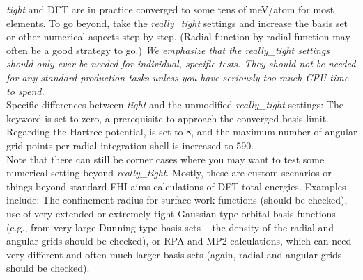 \begin{itemize}
    \emph{tight} and DFT are in practice converged to some tens of
    meV/atom for most elements. To go beyond, take the
    \emph{really\_tight} settings and increase the basis set or other
    numerical aspects step by step. (Radial function by radial 
    function may often be a good strategy to go.) \emph{We emphasize
    that the \emph{really\_tight} settings should only ever be
    needed for individual, specific tests. They should not be
    needed for any standard production tasks unless you have
    seriously too much CPU time to spend.} \\ Specific differences
    between \emph{tight} 
    and the unmodified \emph{really\_tight} settings: The
     keyword is set to zero, a
    prerequisite to approach the converged basis limit. Regarding the
    Hartree potential,  is set to 8,
    and the maximum number of angular grid points per radial
    integration shell is increased to 590. \\  
    Note that there can still
    be corner cases where you may want to test some numerical setting
    beyond \emph{really\_tight}. Mostly, these are custom scenarios or
    things beyond standard FHI-aims calculations of DFT total
    energies. Examples include: The confinement radius for surface
    work functions (should be checked), use of very extended or
    extremely tight Gaussian-type orbital basis functions (e.g., from
    very large Dunning-type basis sets -- the density of the radial
    and angular grids should be checked), or RPA and MP2 calculations,
    which can need very different and often much larger basis sets
    (again, radial and angular grids should be checked). 
\end{itemize}

